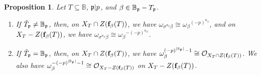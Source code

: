 \documentclass[11pt,pdflatex]{amsart}
\theoremstyle{plain}
\theoremstyle{definition}
\theoremstyle{plain}
\newtheorem{prop}[theorem]{Proposition}
\theoremstyle{definition}
\theoremstyle{remark}
\numberwithin{equation}{section}
\numberwithin{figure}{section} \numberwithin{table}{subsection}
\newcommand{\gerp}{{\frak{p}}}
\newcommand{\calO}{{\mathcal{O}}}
\def\BB{\mathbb{B}}
\begin{document}
\begin{prop}\label{prop: torsion} Let $T \subseteq \BB$, $\gerp|p$, and $\beta \in \BB_\gerp-T_\gerp$.
\begin{enumerate}
\item If $\tilde{T}_\gerp\neq \BB_\gerp$, then,  on $X_T \cap Z({\bf f}_\beta(T))$, we have $\omega_{\sigma^{n_\beta}\beta}  \cong {\omega_\beta}^{(-p)^{n_\beta}}$, and  on $X_T - Z({\bf f}_\beta(T))$, we have $\omega_{\sigma^{n_\beta}\beta}  \cong {\omega_\beta}^{-(-p)^{n_\beta}}$.
\item If $\tilde{T}_\gerp=\BB_\gerp$, then, on $X_T \cap Z({\bf f}_\beta(T))$, we have $\omega_\beta^{(-p)^{|\BB_\gerp|}-1 }\cong \calO_{X_T\cap Z({\bf f}_\beta(T))}$. We also have   $\omega_\beta^{-(-p)^{|\BB_\gerp|}-1 }\cong \calO_{X_T- Z({\bf f}_\beta(T))}$ on 
 $X_T - Z({\bf f}_\beta(T))$.
\end{enumerate}
\end{prop}
\end{document}
